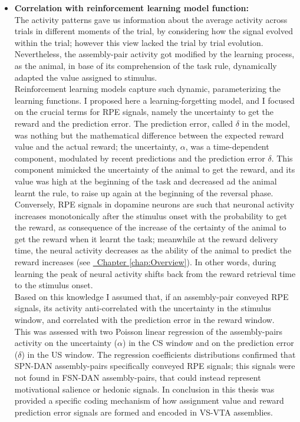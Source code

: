 \begin{itemize}
    \item \textbf{Correlation with reinforcement learning model function:}\\The activity patterns gave us information about the average activity across trials in different moments of the trial, by considering how the signal evolved within the trial; however this view lacked the trial by trial evolution. Nevertheless, the assembly-pair activity got modified by the learning process, as the animal, in base of its comprehension of the task rule, dynamically adapted the value assigned to stimulus.\\Reinforcement learning models capture such dynamic, parameterizing the learning functions. I proposed here a learning-forgetting model, and I focused on the crucial terms for RPE signals, namely the uncertainty to get the reward and the prediction error. The prediction error, called $\delta$ in the model, was nothing but the mathematical difference between the expected reward value and the actual reward; the uncertainty, $\alpha$, was a time-dependent component, modulated by recent predictions and the prediction error $\delta$. This component mimicked the uncertainty of the animal to get the reward, and its value was high at the beginning of the task and decreased ad the animal learnt the rule, to raise up again at the beginning of the reversal phase.\\Conversely, RPE signals in dopamine neurons are such that neuronal activity increases monotonically after the stimulus onset with the probability to get the reward, as consequence of the increase of the certainty of the animal to get the reward when it learnt the task; meanwhile at the reward delivery time, the neural activity decreases as the ability of the animal to predict the reward increases (see \hyperref[chap:Overview]{~Chapter \ref*{chap:Overview}}). In other words, during learning the peak of neural activity shifts back from the reward retrieval time to the stimulus onset.\\Based on this knowledge I assumed that, if an assembly-pair conveyed RPE signals, its activity anti-correlated with the uncertainty in the stimulus window, and correlated with the prediction error in the reward window.\\This was assessed with two Poisson linear regression of the assembly-pairs activity on the uncertainty ($\alpha$) in the CS window and on the prediction error ($\delta$) in the US window. The regression coefficients distributions confirmed that SPN-DAN assembly-pairs specifically conveyed RPE signals; this signals were not found in FSN-DAN assembly-pairs, that could instead represent motivational salience or hedonic signals. In conclusion in this thesis was provided a specific coding mechanism of how assignment value and reward prediction error signals are formed and encoded in VS-VTA assemblies.
\end{itemize}
